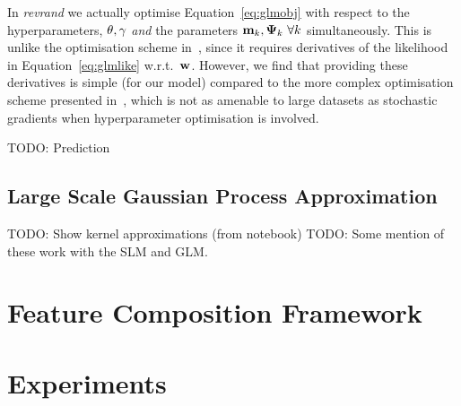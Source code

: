 \documentclass[11pt, oneside]{article}
\begin{document}
In \emph{revrand} we actually optimise Equation~\eqref{eq:glmobj} with respect
to the hyperparameters, $\theta, \gamma$ \emph{and} the parameters $\mathbf{m}_k,
\boldsymbol{\Psi}_k~\forall k$ simultaneously. This is unlike the optimisation scheme 
in~\cite{gershman2012}, since it requires  derivatives of the
likelihood in Equation~\eqref{eq:glmlike} w.r.t.\ $\mathbf{w}$. However, we find
that providing these derivatives is simple (for our model) compared to the more
complex optimisation scheme presented in~\cite{gershman2012}, which is not as
amenable to large datasets as stochastic gradients when hyperparameter 
optimisation is involved.

TODO: Prediction

\subsection{Large Scale Gaussian Process Approximation}

TODO: Show kernel approximations (from notebook)
TODO: Some mention of these work with the SLM and GLM.


\section{Feature Composition Framework}

\section{Experiments}


\printbibliography%
\end{document}

